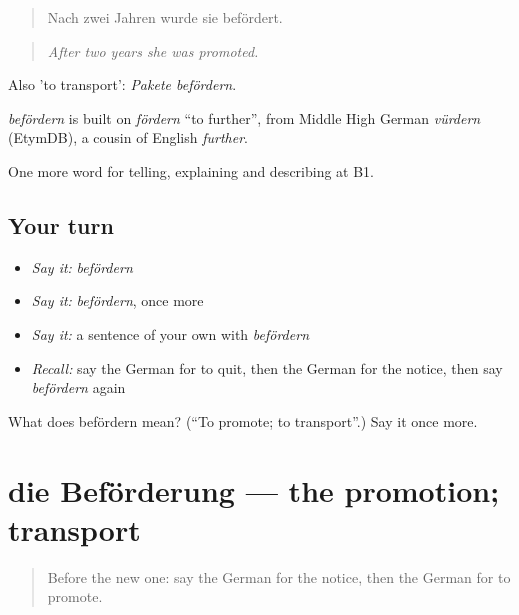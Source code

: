 \begin{quote}
Nach zwei Jahren wurde sie befördert.
\end{quote}

\begin{quote}
\emph{After two years she was promoted.}
\end{quote}

Also 'to transport': \emph{Pakete befördern}.

\begin{cousinweb}
\emph{befördern} is built on \emph{fördern} \textquotedblleft{}to further\textquotedblright{}, from Middle High German \emph{vürdern} (EtymDB), a cousin of English \emph{further}.
\end{cousinweb}

\begin{grammarlens}[title={What you've built}]
One more word for telling, explaining and describing at B1.
\end{grammarlens}

\subsection*{Your turn}
\begin{itemize}
\raggedright
  \item \emph{Say it:} \emph{befördern}
  \item \emph{Say it:} \emph{befördern}, once more
  \item \emph{Say it:} a sentence of your own with \emph{befördern}
  \item \emph{Recall:} say the German for to quit, then the German for the notice, then say \emph{befördern} again
\end{itemize}

\begin{tcolorbox}[breakable,colback=teal!4,colframe=teal!35!black,title={Before you move on}]
What does befördern mean? (\textquotedblleft{}To promote; to transport\textquotedblright{}.) Say it once more.
\end{tcolorbox}
\section[die Beförderung]{die Beförderung — the promotion; transport}

\label{lesson:GE-C301-befoerderung}



\begin{quote}
Before the new one: say the German for the notice, then the German for to promote.
\end{quote}

